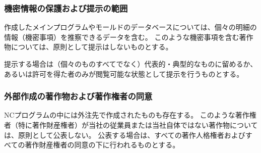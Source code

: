 \subsubsection{機密情報の保護および提示の範囲\label{subsec:notopenwork}}
作成したメインプログラムやモールドのデータベースについては、個々の明細の情報（機密事項）を推察できるデータを含む。
このような機密事項を含む著作物については、原則として提示はしないものとする。

提示する場合は（個々のものすべてでなく）代表的・典型的なものに留めるか、あるいは許可を得た者のみが閲覧可能な状態として提示を行うものとする。

\subsubsection{外部作成の著作物および著作権者の同意\label{subsec:standardscopyrightsSubcontractor}\vphantom{\ref{subsec:standardscopyrightsSubcontractor}}}
NCプログラムの中には外注先で作成されたものも存在する。
このような著作権者（特に著作財産権者）が当社の従業員または当社自体ではない著作物については、原則として公表しない。
公表する場合は、すべての著作人格権者およびすべての著作財産権者の同意の下に行われるものとする。



